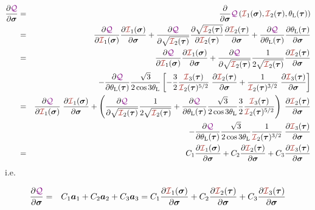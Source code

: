 \begin{eqnarray}
\frac{\partial \QQQ}{\partial \bm\sigma}
&=&
\frac{\partial }{\partial \bm\sigma} \QQQ\left({\III}_1(\bm\sigma),{\III}_2(\bm\tau),\theta_{\rm L}(\bm\tau)\right)\nn\\
&=&
\frac{\partial \QQQ}{\partial {\III}_1(\bm\sigma)} 
\frac{\partial {\III}_1(\bm\sigma)}{\partial \bm\sigma} 
+
\frac{\partial \QQQ}{\partial \sqrt{{\III}_2(\bm\tau)}} 
\frac{\partial \sqrt{ {\III}_2(\bm\tau)}   }{\partial {\III}_2(\bm\tau)} 
\frac{\partial {\III}_2(\bm\tau)}{\partial \bm\sigma} 
+
\frac{\partial \QQQ}{\partial \theta_{\rm L}(\bm\tau)} 
\frac{\partial \theta_{\rm L}(\bm\tau)}{\partial \bm\sigma} \nn\\
&=&
\frac{\partial \QQQ}{\partial {\III}_1(\bm\sigma)} 
\frac{\partial {\III}_1(\bm\sigma)}{\partial \bm\sigma} 
+
\frac{\partial \QQQ}{\partial \sqrt{{\III}_2(\bm\tau)}} 
\frac{1}{2 \sqrt{ {\III}_2(\bm\tau)}   }
\frac{\partial {\III}_2(\bm\tau)}{\partial \bm\sigma} 
\nn\\
&&
-
\frac{\partial \QQQ}{\partial \theta_{\rm L}(\bm\tau)} 
\frac{\sqrt{3}}{2\cos 3\theta_{\rm L}}
\left[
-\frac32  \frac{ {\III}_3(\bm\tau)   }{ {\III}_2(\bm\tau)^{5/2}}
\; \frac{\partial {\III}_2(\bm\tau)}{\partial \bm\sigma} 
+  \frac{1}{{\III}_2(\bm\tau)^{3/2}} 
\; \frac{\partial {\III}_3(\bm\tau)}{\partial \bm\sigma} 
\right] \nn\\
&=&
\frac{\partial \QQQ}{\partial {\III}_1(\bm\sigma)} 
\; \frac{\partial {\III}_1(\bm\sigma)}{\partial \bm\sigma} 
+  
\left(\frac{\partial \QQQ}{\partial \sqrt{{\III}_2(\bm\tau)}} 
\frac{1}{2 \sqrt{ {\III}_2(\bm\tau)}   }   
+
\frac{\partial \QQQ}{\partial \theta_{\rm L}(\bm\tau)} 
\frac{\sqrt{3}}{2\cos 3\theta_{\rm L}}
\frac32  \frac{ {\III}_3(\bm\tau)   }{ {\III}_2(\bm\tau)^{5/2}}
\right)
\; \frac{\partial {\III}_2(\bm\tau)}{\partial \bm\sigma} \nn\\
&&
-
\frac{\partial \QQQ}{\partial \theta_{\rm L}(\bm\tau)} 
\frac{\sqrt{3}}{2\cos 3\theta_{\rm L}}
\frac{1}{{\III}_2(\bm\tau)^{3/2}} 
\; \frac{\partial {\III}_3(\bm\tau)}{\partial \bm\sigma} \nn\\
&=& 
C_1  \frac{\partial {\III}_1(\bm\sigma)}{\partial \bm\sigma} 
+
C_2  \frac{\partial {\III}_2(\bm\tau)}{\partial \bm\sigma} 
+
C_3  \frac{\partial {\III}_3(\bm\tau)}{\partial \bm\sigma} 
\end{eqnarray}
i.e.
\begin{mdframed}[backgroundcolor=blue!5]
\begin{eqnarray}
\frac{\partial \QQQ}{\partial \bm\sigma}
&=& 
C_1 {\bm a}_1 +
C_2 {\bm a}_2 +
C_3 {\bm a}_3 
=
C_1  \frac{\partial {\III}_1(\bm\sigma)}{\partial \bm\sigma} 
+
C_2  \frac{\partial {\III}_2(\bm\tau)}{\partial \bm\sigma} 
+
C_3  \frac{\partial {\III}_3(\bm\tau)}{\partial \bm\sigma} 
\end{eqnarray}
\end{mdframed}
